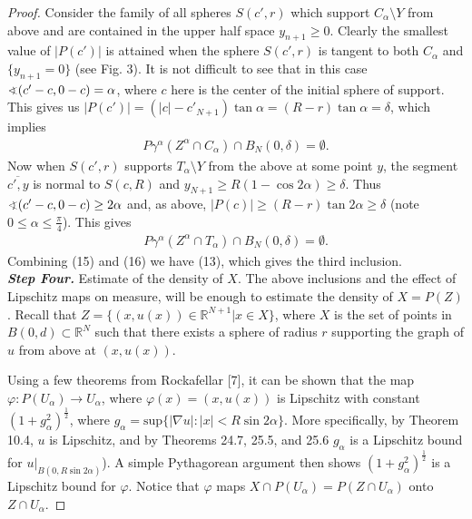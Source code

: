 \documentclass[10pt]{article}
\begin{document}
\begin{proof}
Consider the family of all spheres $S(c',r)$ which support $C_{\alpha}\setminus Y$ from above and are contained in the upper half space $y_{n+1}\geq 0$. Clearly the smallest value of $|P(c')|$ is attained when the sphere $S(c',r)$ is tangent to both $C_{\alpha}$ and $\{y_{n+1}=0\}$ (see Fig. 3). It is not difficult to see that in this case $\varangle (c'-c,0-c)=\alpha$, where $c$ here is the center of the initial sphere of support. 
This gives us $|P(c')|=(|c|-c'_{N+1})\tan\alpha=(R-r)\tan\alpha=\delta$, which implies 
\begin{align}
 P\gamma^{\alpha}(Z^{\alpha}\cap C_{\alpha})\cap B_{N}(0,\delta)=\emptyset.
\end{align}
Now when $S(c',r)$ supports $T_{\alpha}\setminus Y$ from the above at some point $y$, the segment $\overline{c',y}$ is normal to $S(c,R)$ and $y_{N+1}\geq R(1-\cos 2\alpha)\geq \delta$. Thus $\varangle (c'-c,0-c)\geq 2\alpha$ and, as above, $|P(c)|\geq (R-r)\tan 2\alpha \geq \delta$ (note $0\leq \alpha\leq\frac{\pi}{4}$). This gives 
\begin{align}
 P\gamma^{\alpha}(Z^{\alpha}\cap T_{\alpha})\cap B_{N}(0,\delta)=\emptyset.
\end{align}
Combining (15) and (16) we have (13), which gives the third inclusion.\\
\textbf{\textit{Step Four.}} Estimate of the density of $X$. The above inclusions and the effect of Lipschitz maps on measure, will be enough to estimate the density of $X=P(Z)$. Recall that $Z=\{(x,u(x)) \in \mathbb{R}^{N+1} | x \in X \}$, where $X$ is the set of points in $B(0,d)\subset \mathbb{R}^{N}$ such that there exists a sphere of radius $r$ supporting  the graph of $u$ from above at $(x,u(x))$.

Using a few theorems from Rockafellar [7], it can be shown that the map $\varphi : P(U_{\alpha})\rightarrow U_{\alpha}$, where $\varphi(x)=(x,u(x))$ is Lipschitz with constant $(1+g_{\alpha}^{2})^{\frac{1}{2}}$, where $g_{\alpha}=\text{sup} \{ |\nabla u| : |x|< R \sin 2\alpha \}$. More specifically, by Theorem 10.4, $u$ is Lipschitz, and by Theorems 24.7, 25.5, and 25.6 $g_{\alpha}$ is a Lipschitz bound for $u|_{B(0,R\sin 2\alpha)}$). A simple Pythagorean argument then shows $(1+g_{\alpha}^{2})^{\frac{1}{2}}$ is a Lipschitz bound for  $\varphi$. Notice that $\varphi$ maps $X\cap P(U_{\alpha})= P(Z\cap U_{\alpha})$ onto $Z\cap U_{\alpha}$.


\end{proof}
\end{document}
